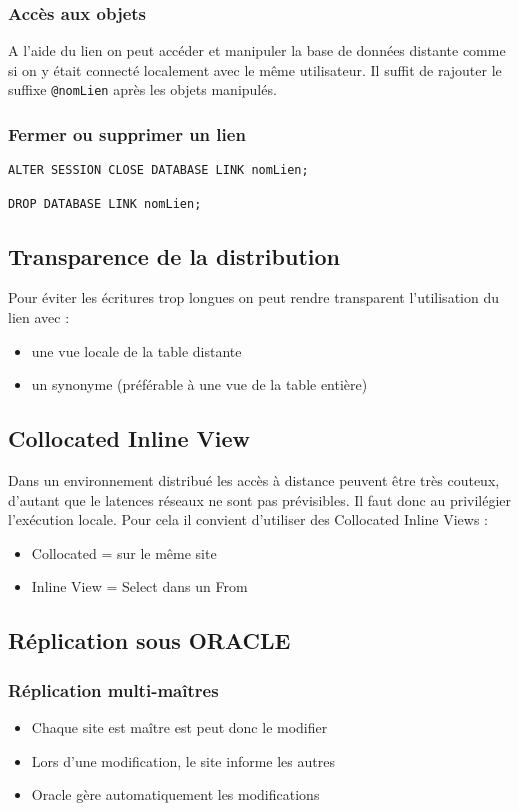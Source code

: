 \documentclass[10pt,a4paper,twoside]{article}
\begin{document}
\subsubsection{Accès aux objets}
A l'aide du lien on peut accéder et manipuler la base de données distante comme si on y était connecté localement avec le même utilisateur. Il suffit de rajouter le suffixe \verb=@nomLien= après les objets manipulés.

\subsubsection{Fermer ou supprimer un lien}
\begin{verbatim}
ALTER SESSION CLOSE DATABASE LINK nomLien;

DROP DATABASE LINK nomLien;
\end{verbatim}

\subsection{Transparence de la distribution}
Pour éviter les écritures trop longues on peut rendre transparent l'utilisation du lien avec :
\begin{itemize}
\item une vue locale de la table distante
\item un synonyme (préférable à une vue de la table entière)
\end{itemize}

\subsection{Collocated Inline View}
Dans un environnement distribué les accès à distance peuvent être très couteux, d'autant que le latences réseaux ne sont pas prévisibles. Il faut donc au privilégier l'exécution locale. Pour cela il convient d'utiliser des Collocated Inline Views :
\begin{itemize}
\item Collocated = sur le même site
\item Inline View = Select dans un From
\end{itemize}

\subsection{Réplication sous ORACLE}
\subsubsection{Réplication multi-maîtres}
\begin{itemize}
\item Chaque site est maître est peut donc le modifier
\item Lors d'une modification, le site informe les autres
\item Oracle gère automatiquement les modifications
\end{itemize}
\end{document}
